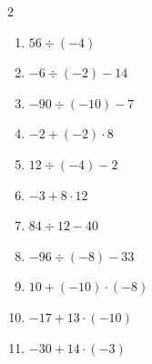 \documentclass[11pt]{article}
\begin{document}
\begin{multicols}{2}
\begin{enumerate}
  \vspace{1.1cm}
  \item $56 \div (-4)$
  \vspace{1.1cm}
  \item $-6 \div (-2) - 14$
  \vspace{1.1cm}
  \item $-90 \div (-10) - 7$
  \vspace{1.1cm}
  \item $-2 + (-2) \cdot 8$
  \vspace{1.1cm}
  \item $12 \div (-4) - 2$
  \vspace{1.1cm}
  \item $-3 + 8 \cdot 12$
  \vspace{1.1cm}
  \item $84 \div 12 - 40$
  \vspace{1.1cm}
  \item $-96 \div (-8) - 33$
  \vspace{1.1cm}
  \item $10 + (-10) \cdot (-8)$
  \vspace{1.1cm}
  \item $-17 + 13 \cdot (-10)$
  \vspace{1.1cm}
  \item $-30 + 14 \cdot (-3)$
  \vspace{1.1cm}
\end{enumerate}
\end{multicols}
\end{document}
